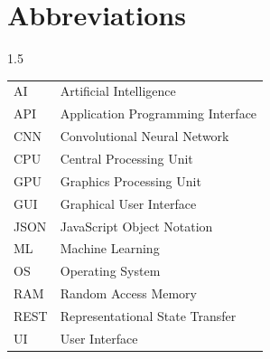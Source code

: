 \chapter*{Abbreviations}
\begin{spacing}{1.5}
\indent
\begin{tabular}{ll}
AI & Artificial Intelligence \\
API & Application Programming Interface \\
CNN & Convolutional Neural Network \\
CPU & Central Processing Unit \\
GPU & Graphics Processing Unit \\
GUI & Graphical User Interface \\
JSON & JavaScript Object Notation \\
ML & Machine Learning \\
OS & Operating System \\
RAM & Random Access Memory \\
REST & Representational State Transfer \\
UI & User Interface \\
\end{tabular}   
\end{spacing}
